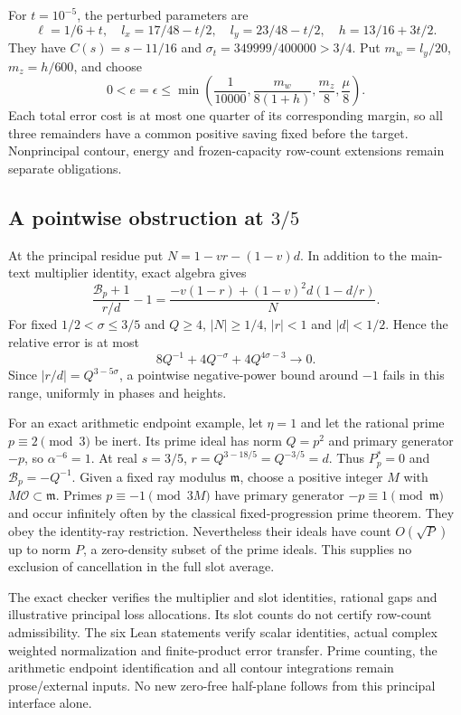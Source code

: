 For $t=10^{-5}$, the perturbed parameters are
\[
 \ell=1/6+t,\quad l_x=17/48-t/2,\quad l_y=23/48-t/2,
 \quad h=13/16+3t/2.
\]
They have $C(s)=s-11/16$ and $\sigma_t=349999/400000>3/4$.
Put $m_w=l_y/20$, $m_z=h/600$, and choose
\[
 0<e=\epsilon\le
 \min\left(\frac1{10000},\frac{m_w}{8(1+h)},\frac{m_z}{8},\frac\mu8\right).
\]
Each total error cost is at most one quarter of its corresponding
margin, so all three remainders have a common positive saving fixed
before the target. Nonprincipal contour, energy and frozen-capacity
row-count extensions remain separate obligations.

\subsection{A pointwise obstruction at $3/5$}
At the principal residue put $N=1-vr-(1-v)d$. In addition to the
main-text multiplier identity, exact algebra gives
\[
 \frac{\mathcal B_p+1}{r/d}-1
 =\frac{-v(1-r)+(1-v)^2d(1-d/r)}{N}.
\]
For fixed $1/2<\sigma\le3/5$ and $Q\ge4$, $|N|\ge1/4$,
$|r|<1$ and $|d|<1/2$. Hence the relative error is at most
\[
 8Q^{-1}+4Q^{-\sigma}+4Q^{4\sigma-3}\longrightarrow0.
\]
Since $|r/d|=Q^{3-5\sigma}$, a pointwise negative-power bound around
$-1$ fails in this range, uniformly in phases and heights.

For an exact arithmetic endpoint example, let $\eta=1$ and let the
rational prime $p\equiv2\pmod3$ be inert. Its prime ideal has norm
$Q=p^2$ and primary generator $-p$, so $\alpha^{-6}=1$.
At real $s=3/5$, $r=Q^{3-18/5}=Q^{-3/5}=d$. Thus $P_p^*=0$
and $\mathcal B_p=-Q^{-1}$. Given a fixed ray modulus $\mathfrak m$,
choose a positive integer $M$ with $M\mathcal O\subset\mathfrak m$.
Primes $p\equiv-1\pmod{3M}$ have primary generator $-p\equiv1\pmod{\mathfrak m}$
and occur infinitely often by the classical fixed-progression prime theorem.
They obey the identity-ray restriction. Nevertheless their ideals have
count $O(\sqrt P)$ up to norm $P$, a zero-density subset of the prime
ideals. This supplies no exclusion of cancellation in the full slot average.

The exact checker  verifies the
multiplier and slot identities, rational gaps and illustrative principal
loss allocations. Its slot counts do not certify row-count admissibility.
The six Lean statements verify scalar identities, actual complex weighted
normalization and finite-product error transfer. Prime counting, the
arithmetic endpoint identification and all contour integrations remain
prose/external inputs. No new zero-free half-plane follows from this
principal interface alone.

